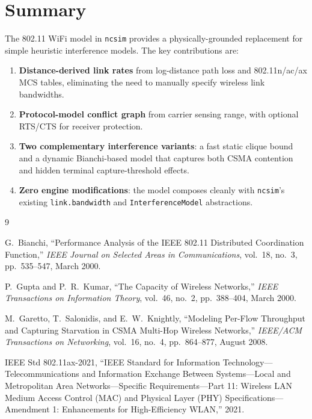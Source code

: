 \documentclass[11pt,letterpaper]{article}
\newcommand{\ncsim}{\texttt{ncsim}}
\begin{document}
\section{Summary}
\label{sec:summary}

The 802.11 WiFi model in \ncsim{} provides a physically-grounded replacement
for simple heuristic interference models.  The key contributions are:

\begin{enumerate}
\item \textbf{Distance-derived link rates} from log-distance path loss and
  802.11n/ac/ax MCS tables, eliminating the need to manually specify wireless
  link bandwidths.
\item \textbf{Protocol-model conflict graph} from carrier sensing range, with
  optional RTS/CTS for receiver protection.
\item \textbf{Two complementary interference variants}: a fast static clique
  bound and a dynamic Bianchi-based model that captures both CSMA contention
  and hidden terminal capture-threshold effects.
\item \textbf{Zero engine modifications}: the model composes cleanly with
  \ncsim{}'s existing \texttt{link.bandwidth} and \texttt{InterferenceModel}
  abstractions.
\end{enumerate}

\begin{thebibliography}{9}

G.~Bianchi,
``Performance Analysis of the IEEE 802.11 Distributed Coordination Function,''
\emph{IEEE Journal on Selected Areas in Communications},
vol.~18, no.~3, pp.~535--547, March 2000.

P.~Gupta and P.~R.~Kumar,
``The Capacity of Wireless Networks,''
\emph{IEEE Transactions on Information Theory},
vol.~46, no.~2, pp.~388--404, March 2000.

M.~Garetto, T.~Salonidis, and E.~W.~Knightly,
``Modeling Per-Flow Throughput and Capturing Starvation in CSMA Multi-Hop
Wireless Networks,''
\emph{IEEE/ACM Transactions on Networking},
vol.~16, no.~4, pp.~864--877, August 2008.

IEEE Std 802.11ax-2021,
``IEEE Standard for Information Technology---Telecommunications and
Information Exchange Between Systems---Local and Metropolitan Area
Networks---Specific Requirements---Part 11: Wireless LAN Medium Access Control
(MAC) and Physical Layer (PHY) Specifications---Amendment 1: Enhancements for
High-Efficiency WLAN,'' 2021.

\end{thebibliography}
\end{document}
